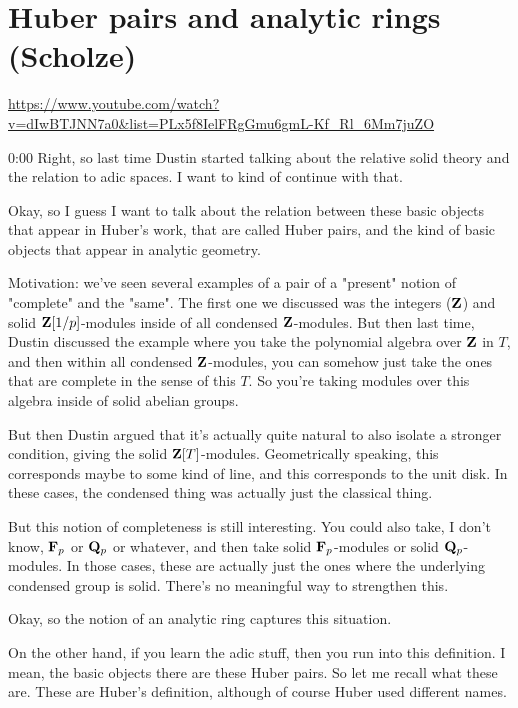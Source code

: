 
\section{\ufs Huber pairs and analytic rings (Scholze)}

\url{https://www.youtube.com/watch?v=dIwBTJNN7a0&list=PLx5f8IelFRgGmu6gmL-Kf_Rl_6Mm7juZO}
\renewcommand{\yt}[2]{\href{https://www.youtube.com/watch?v=dIwBTJNN7a0&list=PLx5f8IelFRgGmu6gmL-Kf_Rl_6Mm7juZO&t=#1}{#2}}
\vspace{1em}

\begin{unfinished}{0:00}
  Right, so last time Dustin started talking about the relative solid theory and the relation to adic spaces. I want to kind of continue with that.

Okay, so I guess I want to talk about the relation between these basic objects that appear in Huber's work, that are called Huber pairs, and the kind of basic objects that appear in analytic geometry.

Motivation: we've seen several examples of a pair of a "present" notion of "complete" and the "same". The first one we discussed was the integers ($\mathbf Z$) and solid $\mathbf Z[1/p]$-modules inside of all condensed $\mathbf Z$-modules. But then last time, Dustin discussed the example where you take the polynomial algebra over $\mathbf Z$ in $T$, and then within all condensed $\mathbf Z$-modules, you can somehow just take the ones that are complete in the sense of this $T$. So you're taking modules over this algebra inside of solid abelian groups.

But then Dustin argued that it's actually quite natural to also isolate a stronger condition, giving the solid $\mathbf Z[T]$-modules. Geometrically speaking, this corresponds maybe to some kind of line, and this corresponds to the unit disk. In these cases, the condensed thing was actually just the classical thing.

But this notion of completeness is still interesting. You could also take, I don't know, $\mathbf F_p$ or $\mathbf Q_p$ or whatever, and then take solid $\mathbf F_p$-modules or solid $\mathbf Q_p$-modules. In those cases, these are actually just the ones where the underlying condensed group is solid. There's no meaningful way to strengthen this.

Okay, so the notion of an analytic ring captures this situation.

On the other hand, if you learn the adic stuff, then you run into this definition. I mean, the basic objects there are these Huber pairs. So let me recall what these are. These are Huber's definition, although of course Huber used different names.


\end{unfinished}
